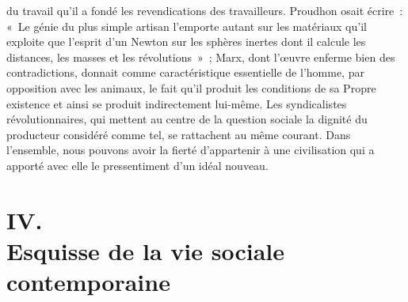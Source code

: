 \documentclass[french,twoside]{book} %
\begin{document}
du travail qu'il a fondé les revendications des travailleurs. Proudhon osait écrire : « Le génie du plus simple artisan l'emporte autant sur les matériaux qu'il exploite que l'esprit d'un Newton sur les sphères inertes dont il calcule les distances, les masses et les révolutions » ; Marx, dont l'œuvre enferme bien des contradictions, donnait comme caractéristique essentielle de l'homme, par opposition avec les animaux, le fait qu'il produit les conditions de sa Propre existence et ainsi se produit indirectement lui-même. Les syndicalistes révolutionnaires, qui mettent au centre de la question sociale la dignité du producteur considéré comme tel, se rattachent au même courant. Dans l'ensemble, nous pouvons avoir la fierté d'appartenir à une civilisation qui a apporté avec elle le pressentiment d'un idéal nouveau.\par

\section[{IV. Esquisse de la vie sociale contemporaine}]{IV. \\
Esquisse de la vie sociale contemporaine}\renewcommand{\leftmark}{IV. \\
Esquisse de la vie sociale contemporaine}
\end{document}
